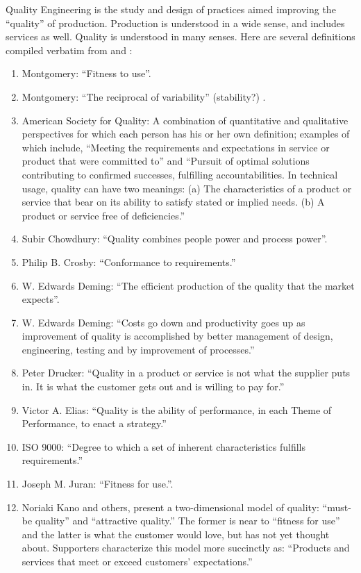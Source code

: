 \documentclass[12pt,a4paper]{report}
\begin{document}
Quality Engineering is the study and design of practices aimed improving the ``quality'' of production. 
Production is understood in a wide sense, and includes services as well.
Quality is understood in many senses. Here are several definitions compiled verbatim from \cite{montgomery_introduction_2007}  and \cite{wikipedia_quality_2015}:
\begin{enumerate}
\item Montgomery: ``Fitness to use''.
\item Montgomery: ``The reciprocal of variability'' (stability?) .
\item American Society for Quality:
A combination of quantitative and qualitative perspectives for which each person has his or her own definition; examples of which include, ``Meeting the requirements and expectations in service or product that were committed to'' and ``Pursuit of optimal solutions contributing to confirmed successes, fulfilling accountabilities.
 In technical usage, quality can have two meanings: 
 (a) The characteristics of a product or service that bear on its ability to satisfy stated or implied needs. 
 (b) A product or service free of deficiencies.''
\item Subir Chowdhury: 
``Quality combines people power and process power''.
\item Philip B. Crosby: 
``Conformance to requirements.''
\item  W. Edwards Deming:
``The efficient production of the quality that the market expects''.
\item W. Edwards Deming: 
``Costs go down and productivity goes up as improvement of quality is accomplished by better management of design, engineering, testing and by improvement of processes.''
\item Peter Drucker: 
``Quality in a product or service is not what the supplier puts in. It is what the customer gets out and is willing to pay for.''
\item Victor A. Elias: 
``Quality is the ability of performance, in each Theme of Performance, to enact a strategy.''
\item ISO 9000: 
``Degree to which a set of inherent characteristics fulfills requirements.'' 
\item Joseph M. Juran: 
``Fitness for use.''. 
\item Noriaki Kano and others, present a two-dimensional model of quality: ``must-be quality'' and ``attractive quality.'' The former is near to ``fitness for use'' and the latter is what the customer would love, but has not yet thought about. Supporters characterize this model more succinctly as: ``Products and services that meet or exceed customers' expectations.''

\end{enumerate}
\end{document}

